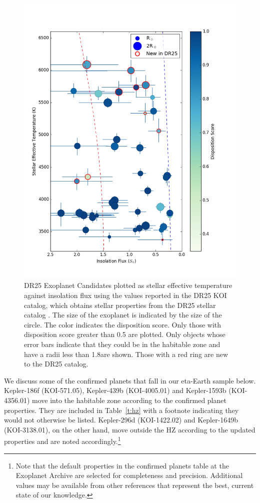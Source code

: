 \begin{figure}
    \centering
    \includegraphics[width=1.1\linewidth]{fig-hzTstarInsol.png}
    \caption{DR25 Exoplanet Candidates plotted as stellar effective temperature against insolation flux using the values reported in the DR25 KOI catalog, which obtains stellar properties from the DR25 stellar catalog \citep{Mathur2017ApJS}. The size of the exoplanet is indicated by the size of the circle.  The color indicates the disposition score. Only those with disposition score greater than 0.5 are plotted.  Only objects whose error bars indicate that they could be in the habitable zone and have a radii less than 1.8\re are shown. Those with a red ring are new to the DR25 catalog. }
    \label{f:hzNarrow}
\end{figure}





We discuss some of the confirmed planets that fall in our eta-Earth sample below.  Kepler-186f (KOI-571.05), Kepler-439b (KOI-4005.01) and Kepler-1593b (KOI-4356.01) move into the habitable zone according to the confirmed planet properties. They are included in Table~\ref{t:hz} with a footnote indicating they would not otherwise be listed. Kepler-296d (KOI-1422.02) and Kepler-1649b (KOI-3138.01), on the other hand, move outside the HZ according to the updated properties and are noted accordingly.\footnote{Note that the default properties in the confirmed planets table at the Exoplanet Archive are selected for completeness and precision. Additional values may be available from other references that represent the best, current state of our knowledge. } 

